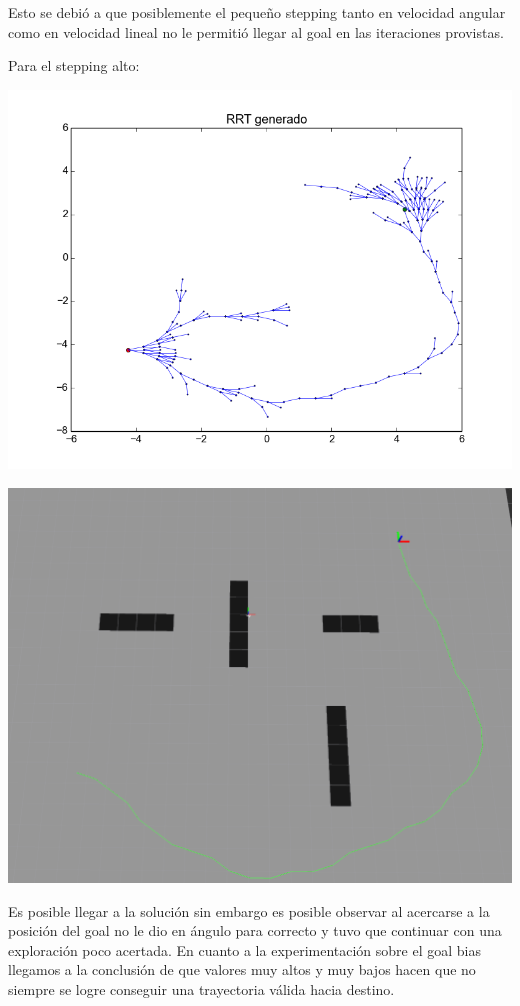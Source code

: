 Esto se debió a que posiblemente el pequeño stepping tanto en velocidad angular como en velocidad lineal no le permitió llegar al goal en las iteraciones provistas.

Para el stepping alto:

\includegraphics[scale=0.5]{velocidad/stepping_alto2.png}

\includegraphics[scale=0.3]{velocidad/stepping_alto_rviz2.png}

Es posible llegar a la solución sin embargo es posible observar al acercarse a la posición del goal no le dio en ángulo para correcto y tuvo que continuar con una exploración poco acertada.
%
%
%
En cuanto a la experimentación sobre el goal bias llegamos a la conclusión de que valores muy altos y muy bajos hacen que no siempre se logre conseguir una trayectoria válida hacia destino.

